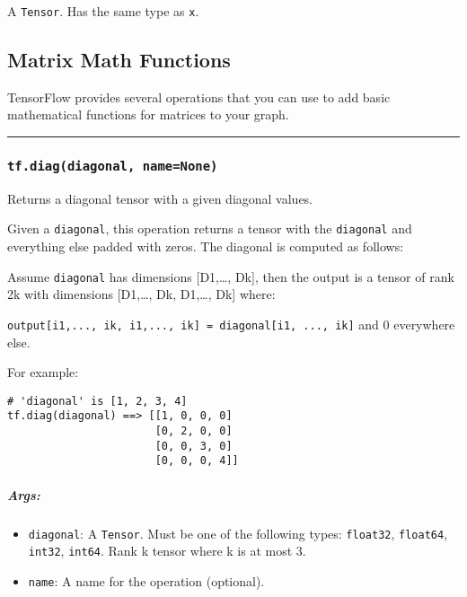 A \texttt{Tensor}. Has the same type as \texttt{x}.

\subsection{Matrix Math Functions }\label{matrix-math-functions}

TensorFlow provides several operations that you can use to add basic
mathematical functions for matrices to your graph.

\begin{center}\rule{0.5\linewidth}{\linethickness}\end{center}

\subsubsection{\texorpdfstring{\texttt{tf.diag(diagonal,\ name=None)}
}{tf.diag(diagonal, name=None) }}\label{tf.diagdiagonal-namenone}

Returns a diagonal tensor with a given diagonal values.

Given a \texttt{diagonal}, this operation returns a tensor with the
\texttt{diagonal} and everything else padded with zeros. The diagonal is
computed as follows:

Assume \texttt{diagonal} has dimensions {[}D1,\ldots{}, Dk{]}, then the
output is a tensor of rank 2k with dimensions {[}D1,\ldots{}, Dk,
D1,\ldots{}, Dk{]} where:

\texttt{output{[}i1,...,\ ik,\ i1,...,\ ik{]}\ =\ diagonal{[}i1,\ ...,\ ik{]}}
and 0 everywhere else.

For example:

\begin{verbatim}
# 'diagonal' is [1, 2, 3, 4]
tf.diag(diagonal) ==> [[1, 0, 0, 0]
                       [0, 2, 0, 0]
                       [0, 0, 3, 0]
                       [0, 0, 0, 4]]
\end{verbatim}

\subparagraph{Args: }\label{args-23}

\begin{itemize}
\tightlist
\item
  \texttt{diagonal}: A \texttt{Tensor}. Must be one of the following
  types: \texttt{float32}, \texttt{float64}, \texttt{int32},
  \texttt{int64}. Rank k tensor where k is at most 3.
\item
  \texttt{name}: A name for the operation (optional).
\end{itemize}

